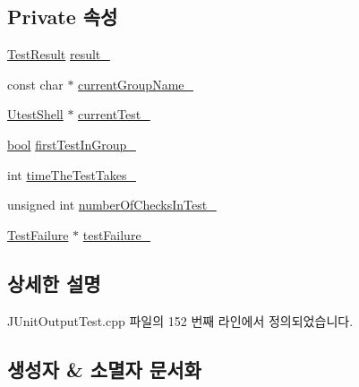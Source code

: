 \subsection*{Private 속성}
\begin{DoxyCompactItemize}
\item 
\hyperlink{class_test_result}{Test\+Result} \hyperlink{class_j_unit_test_output_test_runner_afb2ec6cf0ab3f3e57bc2304e0df97c29}{result\+\_\+}
\item 
const char $\ast$ \hyperlink{class_j_unit_test_output_test_runner_a70fd75604cc3dfbeca6b9e989ad7db4d}{current\+Group\+Name\+\_\+}
\item 
\hyperlink{class_utest_shell}{Utest\+Shell} $\ast$ \hyperlink{class_j_unit_test_output_test_runner_aeaab551a9f611af700515cdfb37bef1f}{current\+Test\+\_\+}
\item 
\hyperlink{avb__gptp_8h_af6a258d8f3ee5206d682d799316314b1}{bool} \hyperlink{class_j_unit_test_output_test_runner_aeaa306bd999397e0452169bb3775a306}{first\+Test\+In\+Group\+\_\+}
\item 
int \hyperlink{class_j_unit_test_output_test_runner_a8b698df0e57add2de8378df388c5fd19}{time\+The\+Test\+Takes\+\_\+}
\item 
unsigned int \hyperlink{class_j_unit_test_output_test_runner_a2a1887c6b2c23bbf0a6ae2ce4523eb8c}{number\+Of\+Checks\+In\+Test\+\_\+}
\item 
\hyperlink{class_test_failure}{Test\+Failure} $\ast$ \hyperlink{class_j_unit_test_output_test_runner_ae0c6f0b2acc5959ec9545ae82d5e39ef}{test\+Failure\+\_\+}
\end{DoxyCompactItemize}


\subsection{상세한 설명}


J\+Unit\+Output\+Test.\+cpp 파일의 152 번째 라인에서 정의되었습니다.



\subsection{생성자 \& 소멸자 문서화}
